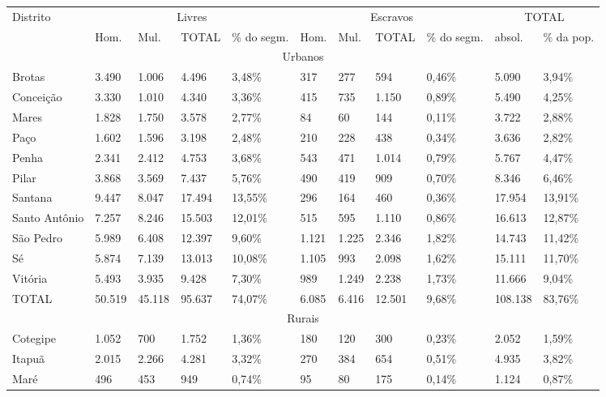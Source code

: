 \begin{table}[!htp]
{
\begin{minipage}{18cm}
\begin{tiny}
\begin{tabular}{m{1.3cm} m{1cm} m{1cm} m{1.1cm}  m{1cm} m{0.7cm} m{0.7cm} m{1.1cm} m{1cm} m{1cm} m{1cm}}
\hline
\multirow{2}{*}{Distrito} & \multicolumn{4}{c}{Livres} & \multicolumn{4}{c}{Escravos} & \multicolumn{2}{c}{TOTAL} \\
\cline{2-11}	&Hom.	&Mul.	&TOTAL	&\% do segm.	&Hom.	&Mul. 	&TOTAL	&\% do segm.	&absol.	& \% da pop. \\
\hline
\multicolumn{11}{c}{Urbanos}\\
\hline
Brotas	&3.490	&1.006	&4.496	&3,48\%	&317	&277	&594	&0,46\%	&5.090	&3,94\%	\\
Conceição	&3.330	&1.010	&4.340	&3,36\%	&415	&735	&1.150	&0,89\%	&5.490	&4,25\%	\\
Mares	&1.828	&1.750	&3.578	&2,77\%	&84	&60	&144	&0,11\%	&3.722	&2,88\%	\\
Paço	&1.602	&1.596	&3.198	&2,48\%	&210	&228	&438	&0,34\%	&3.636	&2,82\%	\\
Penha	&2.341	&2.412	&4.753	&3,68\%	&543	&471	&1.014	&0,79\%	&5.767	&4,47\%	\\
Pilar	&3.868	&3.569	&7.437	&5,76\%	&490	&419	&909	&0,70\%	&8.346	&6,46\%	\\
Santana	&9.447	&8.047	&17.494	&13,55\%	&296	&164	&460	&0,36\%	&17.954	&13,91\%	\\
Santo Antônio	&7.257	&8.246	&15.503	&12,01\%	&515	&595	&1.110	&0,86\%	&16.613	&12,87\%	\\
São Pedro	&5.989	&6.408	&12.397	&9,60\%	&1.121	&1.225	&2.346	&1,82\%	&14.743	&11,42\%	\\
Sé	&5.874	&7.139	&13.013	&10,08\%	&1.105	&993	&2.098	&1,62\%	&15.111	&11,70\%	\\
Vitória	&5.493	&3.935	&9.428	&7,30\%	&989	&1.249	&2.238	&1,73\%	&11.666	&9,04\%	\\
TOTAL	&50.519	&45.118	&95.637	&74,07\%	&6.085	&6.416	&12.501	&9,68\%	&108.138	&83,76\%	\\
\hline
\multicolumn{11}{c}{Rurais}\\
\hline
Cotegipe	&1.052	&700	&1.752	&1,36\%	&180	&120	&300	&0,23\%	&2.052	&1,59\%	\\
Itapuã	&2.015	&2.266	&4.281	&3,32\%	&270	&384	&654	&0,51\%	&4.935	&3,82\%	\\
Maré	&496	&453	&949	&0,74\%	&95	&80	&175	&0,14\%	&1.124	&0,87\%	\\

\end{tabular}
\end{tiny}
\end{minipage}}
\end{table}

